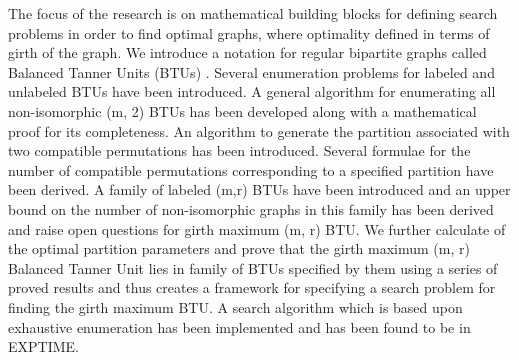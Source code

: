 \endtitle

The focus of the research is on mathematical building blocks for defining search problems in order to find optimal graphs, where optimality defined in terms of girth of the graph. We introduce a notation for regular bipartite graphs called Balanced Tanner Units (BTUs) . Several enumeration problems for labeled and unlabeled BTUs have been introduced. A general algorithm for enumerating all non-isomorphic (m, 2) BTUs has been developed along with a mathematical proof for its completeness. An algorithm to generate the partition associated with two compatible permutations has been introduced. Several formulae for the number of compatible permutations corresponding to a specified partition have been derived. A family of labeled (m,r) BTUs have been introduced and an upper bound on the number of non-isomorphic graphs in this family has been derived and raise open questions for girth maximum (m, r) BTU. We further calculate of the optimal partition parameters and prove that the girth maximum (m, r) Balanced Tanner Unit lies in family of BTUs specified by them using a series of proved results and thus creates a framework for specifying a search problem for finding the girth maximum BTU. A search algorithm which is based upon exhaustive enumeration has been implemented and has been found to be in EXPTIME.